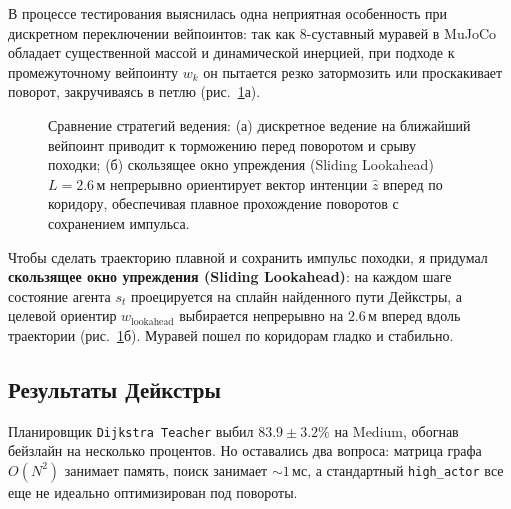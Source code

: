 В процессе тестирования выяснилась одна неприятная особенность при дискретном переключении вейпоинтов: так как 8-суставный муравей в MuJoCo обладает существенной массой и динамической инерцией, при подходе к промежуточному вейпоинту $w_k$ он пытается резко затормозить или проскакивает поворот, закручиваясь в петлю (рис.~\ref{fig:sliding_lookahead}а).

\begin{figure}[H]
    \centering
    
    \caption{Сравнение стратегий ведения: (а) дискретное ведение на ближайший вейпоинт приводит к торможению перед поворотом и срыву походки; (б) скользящее окно упреждения (Sliding Lookahead) $L = 2.6\,\text{м}$ непрерывно ориентирует вектор интенции $\hat{z}$ вперед по коридору, обеспечивая плавное прохождение поворотов с сохранением импульса.}
    \label{fig:sliding_lookahead}
\end{figure}

Чтобы сделать траекторию плавной и сохранить импульс походки, я придумал \textbf{скользящее окно упреждения (Sliding Lookahead)}: на каждом шаге состояние агента $s_t$ проецируется на сплайн найденного пути Дейкстры, а целевой ориентир $w_{\text{lookahead}}$ выбирается непрерывно на $2.6\,\text{м}$ вперед вдоль траектории (рис.~\ref{fig:sliding_lookahead}б). Муравей пошел по коридорам гладко и стабильно.

\subsection{Результаты Дейкстры}
Планировщик \texttt{Dijkstra Teacher} выбил $83.9 \pm 3.2\%$ на Medium, обогнав бейзлайн на несколько процентов. Но оставались два вопроса: матрица графа $O(N^2)$ занимает память, поиск занимает $\sim 1\,\text{мс}$, а стандартный \texttt{high\_actor} все еще не идеально оптимизирован под повороты.
